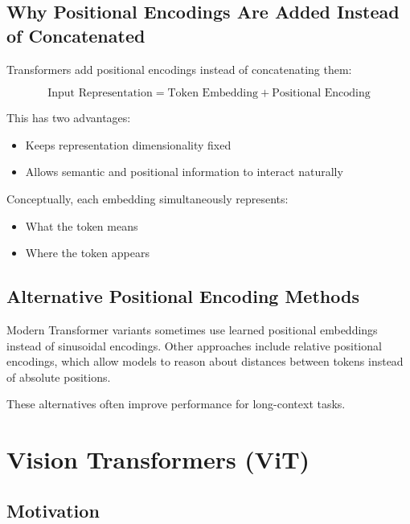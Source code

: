 \documentclass[11pt]{article}
\begin{document}
\subsection{Why Positional Encodings Are Added Instead of Concatenated}

Transformers add positional encodings instead of concatenating them:

\[
\text{Input Representation}
=
\text{Token Embedding}
+
\text{Positional Encoding}
\]

This has two advantages:

\begin{itemize}

\item Keeps representation dimensionality fixed
\item Allows semantic and positional information to interact naturally

\end{itemize}

Conceptually, each embedding simultaneously represents:

\begin{itemize}

\item What the token means
\item Where the token appears

\end{itemize}

\subsection{Alternative Positional Encoding Methods}

Modern Transformer variants sometimes use learned positional embeddings instead of sinusoidal encodings. Other approaches include relative positional encodings, which allow models to reason about distances between tokens instead of absolute positions.

These alternatives often improve performance for long-context tasks.

\section{Vision Transformers (ViT)}

\subsection{Motivation}
\end{document}
